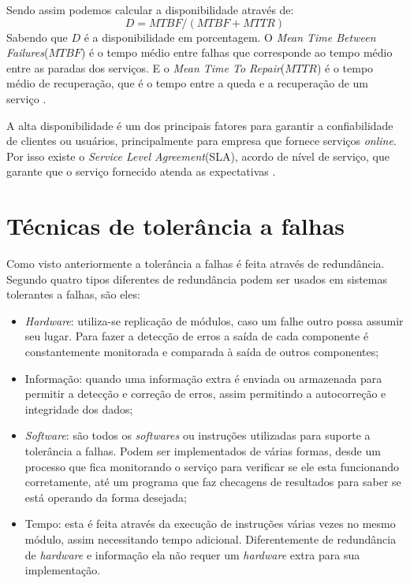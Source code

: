 Sendo assim podemos calcular a disponibilidade através de:\\
\begin{equation}
D = MTBF / (MTBF + MTTR)
\label{diponibilidade}
\end{equation}
Sabendo que $D$ é a disponibilidade em porcentagem. O \textit{Mean Time Between Failures}($MTBF$) é o tempo médio entre falhas que corresponde
ao tempo médio entre as paradas dos serviços. E o \textit{Mean Time To Repair}($MTTR$) é o tempo médio de recuperação, que é o tempo 
entre a queda e a recuperação de um serviço \cite{goncalves2009}.

A alta disponibilidade é um dos principais fatores para garantir a confiabilidade de clientes ou usuários, principalmente para empresa que 
fornece serviços \textit{online}. Por isso existe o \textit{Service Level Agreement}(SLA), acordo de nível de serviço, 
que garante que o serviço fornecido atenda as expectativas \cite{smith2010}.

\section{Técnicas de tolerância a falhas}

Como visto anteriormente a tolerância a falhas é feita através de redundância. Segundo \cite{norvag2000} quatro tipos diferentes de redundância
podem ser usados em sistemas tolerantes a falhas, são eles:
\begin{itemize}
 \item \textit{Hardware}: utiliza-se replicação de módulos, caso um falhe outro possa assumir seu lugar. Para fazer a detecção de erros
 a saída de cada componente é constantemente monitorada e comparada à saída de outros componentes;
 \item Informação: quando uma informação extra é enviada ou armazenada para permitir a detecção e correção de erros, assim permitindo
 a autocorreção e integridade dos dados;
 \item \textit{Software}: são todos os \textit{softwares} ou instruções utilizadas para suporte a tolerância a falhas. Podem ser implementados
 de várias formas, desde um processo que fica monitorando o serviço para verificar se ele esta funcionando corretamente, até um programa
 que faz checagens de resultados para saber se está operando da forma desejada;
 \item Tempo: esta é feita através da execução de instruções várias vezes no mesmo módulo, assim necessitando tempo adicional. 
 Diferentemente de redundância de \textit{hardware} e informação ela não requer um \textit{hardware} extra para sua implementação.
\end{itemize}



